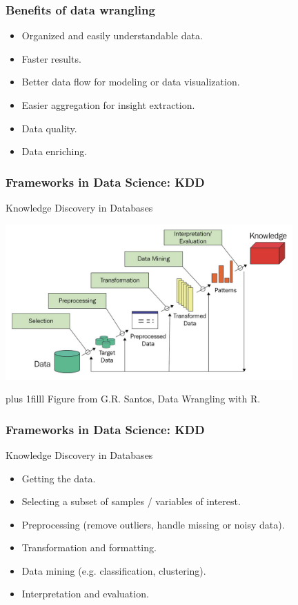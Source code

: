 \documentclass{beamer}
\newcommand{\btVFill}{\vskip0pt plus 1filll}
\begin{document}
	\begin{frame}
		\frametitle{Benefits of data wrangling}

		\begin{itemize}
			\item Organized and easily understandable data.
			\item Faster results.
			\item Better data flow for modeling or data visualization.
			\item Easier aggregation for insight extraction.
			\item Data quality.
			\item Data enriching.
		\end{itemize}

	\end{frame}

	\begin{frame}
		\frametitle{Frameworks in Data Science: KDD}

		Knowledge Discovery in Databases

		\includegraphics[width=11cm]{Santos_1_6.png}

		\btVFill
		\tiny{Figure from G.R. Santos, Data Wrangling with R.}

	\end{frame}

	\begin{frame}
		\frametitle{Frameworks in Data Science: KDD}

		Knowledge Discovery in Databases

		\vspace{2em}

		\begin{itemize}
			\item Getting the data.
			\item Selecting a subset of samples / variables of interest.
			\item Preprocessing (remove outliers, handle missing or noisy data).
			\item Transformation and formatting.
			\item Data mining (e.g. classification, clustering).
			\item Interpretation and evaluation.
		\end{itemize}

	\end{frame}
\end{document}
